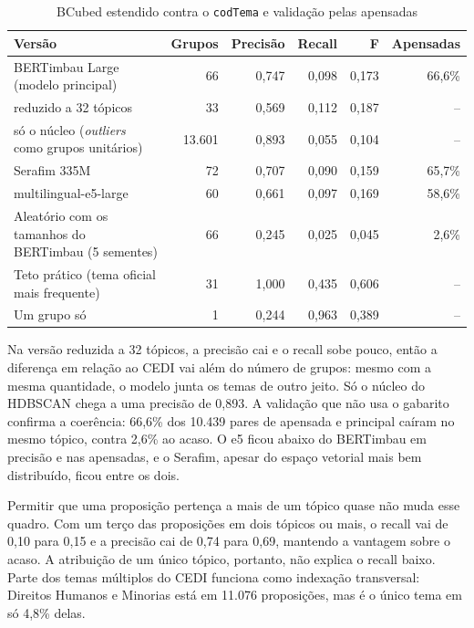 \begin{table}[H]
\centering
\caption{BCubed estendido contra o \texttt{codTema} e validação pelas apensadas}
\label{tab:bcubed}
\small
\begin{tabularx}{\textwidth}{>{\raggedright\arraybackslash}X r r r r r}
\toprule
\textbf{Versão} & \textbf{Grupos} & \textbf{Precisão} & \textbf{Recall} & \textbf{F} & \textbf{Apensadas} \\
\midrule
BERTimbau Large (modelo principal) & 66 & 0,747 & 0,098 & 0,173 & 66,6\% \\
\quad reduzido a 32 tópicos & 33 & 0,569 & 0,112 & 0,187 & -- \\
\quad só o núcleo (\textit{outliers} como grupos unitários) & 13.601 & 0,893 & 0,055 & 0,104 & -- \\
Serafim 335M & 72 & 0,707 & 0,090 & 0,159 & 65,7\% \\
multilingual-e5-large & 60 & 0,661 & 0,097 & 0,169 & 58,6\% \\
\midrule
Aleatório com os tamanhos do BERTimbau (5 sementes) & 66 & 0,245 & 0,025 & 0,045 & 2,6\% \\
Teto prático (tema oficial mais frequente) & 31 & 1,000 & 0,435 & 0,606 & -- \\
Um grupo só & 1 & 0,244 & 0,963 & 0,389 & -- \\
\bottomrule
\end{tabularx}
\end{table}

Na versão reduzida a 32 tópicos, a precisão cai e o recall sobe pouco, então a diferença em relação ao CEDI vai além do número de grupos: mesmo com a mesma quantidade, o modelo junta os temas de outro jeito. Só o núcleo do HDBSCAN chega a uma precisão de 0,893. A validação que não usa o gabarito confirma a coerência: 66,6\% dos 10.439 pares de apensada e principal caíram no mesmo tópico, contra 2,6\% ao acaso. O e5 ficou abaixo do BERTimbau em precisão e nas apensadas, e o Serafim, apesar do espaço vetorial mais bem distribuído, ficou entre os dois.

Permitir que uma proposição pertença a mais de um tópico quase não muda esse quadro. Com um terço das proposições em dois tópicos ou mais, o recall vai de 0,10 para 0,15 e a precisão cai de 0,74 para 0,69, mantendo a vantagem sobre o acaso. A atribuição de um único tópico, portanto, não explica o recall baixo. Parte dos temas múltiplos do CEDI funciona como indexação transversal: Direitos Humanos e Minorias está em 11.076 proposições, mas é o único tema em só 4,8\% delas.

